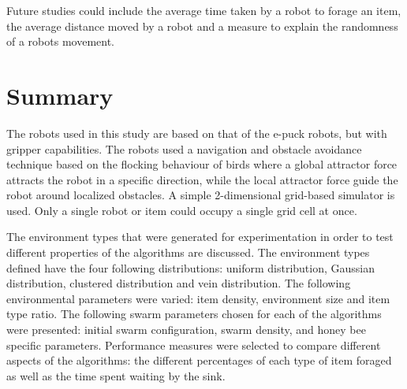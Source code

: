 Future studies could include the average time taken by a robot to forage an item, the average distance moved by a robot and a measure to explain the randomness of a robots movement. 




\section{Summary}
\label{third:summary}
The robots used in this study are based on that of the e-puck robots, but with gripper capabilities. The robots used a navigation and obstacle avoidance technique based on the flocking behaviour of birds where a global attractor force attracts the robot in a specific direction, while the local attractor force guide the robot around localized obstacles. A simple 2-dimensional grid-based simulator is used. Only a single robot or item could occupy a single grid cell at once.

The environment types that were generated for experimentation in order to test different properties of the algorithms are discussed. The environment types defined have the four following distributions: uniform distribution, Gaussian distribution, clustered distribution and vein distribution. The following environmental parameters were varied: item density, environment size and item type ratio. The following swarm parameters chosen for each of the algorithms were presented: initial swarm configuration, swarm density, and honey bee specific parameters. Performance measures were selected to compare different aspects of the algorithms: the different percentages of each type of item foraged as well as the time spent waiting by the sink. 



